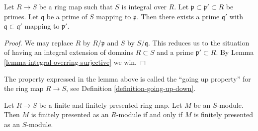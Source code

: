 \begin{lemma}
\label{lemma-integral-going-up}
Let $R \to S$ be a ring map such that
$S$ is integral over $R$.
Let $\mathfrak p \subset \mathfrak p' \subset R$
be primes. Let $\mathfrak q$ be a prime of $S$ mapping
to $\mathfrak p$. Then there exists a prime $\mathfrak q'$
with $\mathfrak q \subset \mathfrak q'$
mapping to $\mathfrak p'$.
\end{lemma}

\begin{proof}
We may replace $R$ by $R/\mathfrak p$ and $S$ by $S/\mathfrak q$.
This reduces us to the situation of having an integral
extension of domains $R \subset S$ and a prime $\mathfrak p' \subset R$.
By Lemma \ref{lemma-integral-overring-surjective} we win.
\end{proof}

\noindent
The property expressed in the lemma above is called
the ``going up property'' for the ring map $R \to S$,
see Definition \ref{definition-going-up-down}.

\begin{lemma}
\label{lemma-finite-finitely-presented-extension}
Let $R \to S$ be a finite and finitely presented ring map.
Let $M$ be an $S$-module.
Then $M$ is finitely presented as an $R$-module if and only if
$M$ is finitely presented as an $S$-module.
\end{lemma}

